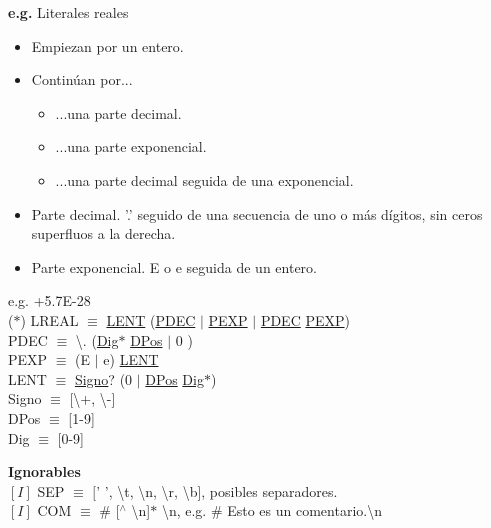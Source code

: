 \documentclass[\main/Apuntes_PL.tex]{subfiles}
\begin{document}
      \bigskip
      \par \noindent
      \textbf{e.g.} Literales reales
      \begin{itemize}
        \item Empiezan por un entero.
        \item Continúan por...
              \begin{itemize}
                \item ...una parte decimal.
                \item ...una parte exponencial.
                \item ...una parte decimal seguida de una exponencial.
              \end{itemize}
        \item Parte decimal. '.' seguido de una secuencia de uno o más dígitos, sin ceros superfluos a la derecha.
        \item Parte exponencial. E o e seguida de un entero.
      \end{itemize}
      \hspace{10mm}e.g. +5.7E-28\\
      \bigskip
      \hspace{5mm}($\ast$) LREAL $\equiv$ \underline{LENT} (\underline{PDEC} $\mid$ \underline{PEXP} $\mid$ \underline{PDEC} \underline{PEXP}) \\
      \hspace{10mm} PDEC $\equiv$ \textbackslash. (\underline{Dig}$\ast$ \underline{DPos} $\mid$ 0 ) \\
      \hspace{10mm} PEXP $\equiv$ (E $\mid$ e) \underline{LENT} \\
      \vspace{2mm}
      \hspace{10mm} LENT $\equiv$ \underline{Signo}? (0 $\mid$ \underline{DPos} \underline{Dig}$\ast$) \\
      \hspace{10mm} Signo $\equiv$ [\textbackslash+, \textbackslash-] \\
      \hspace{10mm} DPos  $\equiv$ [1-9] \\
      \hspace{10mm} Dig   $\equiv$ [0-9]

      \newpage
      \par \noindent
      \textbf{\large Ignorables} \\
      \hspace{3mm}$[I]$ SEP $\equiv$ $[$' ', \textbackslash t, \textbackslash n, \textbackslash r, \textbackslash b], posibles separadores. \\
      \hspace{3mm}$[I]$ COM $\equiv$ \# [$^\wedge$ \textbackslash n]$\ast$ \textbackslash n, e.g. \# Esto es un comentario.\textbackslash n
\end{document}
